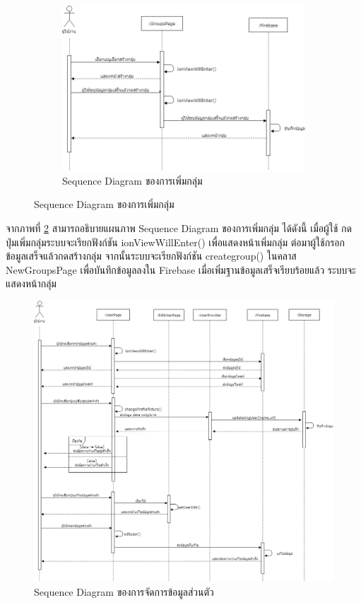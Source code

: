 \begin{figure}
	\begin{figure}[H]
		\centering
		\includegraphics[width=0.8\columnwidth]
		{Figures/3/Sequence/addgroup}
		\caption{Sequence Diagram ของการเพิ่มกลุ่ม}
		\label{Fig:Sequence-addgroup}
	\end{figure}
\end{figure}
\newpage

จากภาพที่ \ref{Fig:Sequence-addgroup} สามารถอธิบายแผนภาพ Sequence Diagram ของการเพิ่มกลุ่ม ได้ดังนี้ เมื่อผู้ใช้
กดปุ่มเพิ่มกลุ่มระบบจะเรียกฟังก์ชัน ionViewWillEnter() เพื่อแสดงหน้าเพิ่มกลุ่ม ต่อมาผู้ใช้กรอกข้อมูลเสร็จแล้วกดสร้างกลุ่ม 
จากนั้นระบบจะเรียกฟังก์ชัน creategroup() ในคลาส NewGroupsPage เพื่อบันทึกข้อมูลลงใน Firebase เมื่อเพิ่มฐานข้อมูลเสร็จเรียบร้อยแล้ว 
ระบบจะแสดงหน้ากลุ่ม
\newpage

\begin{figure}[H]
	\centering
	\includegraphics[width=1.1\columnwidth]
	{Figures/3/Sequence/edituser}
	\caption{Sequence Diagram ของการจัดการข้อมูลส่วนตัว}
	\label{Fig:Sequence-edituser}
\end{figure}
\newpage

